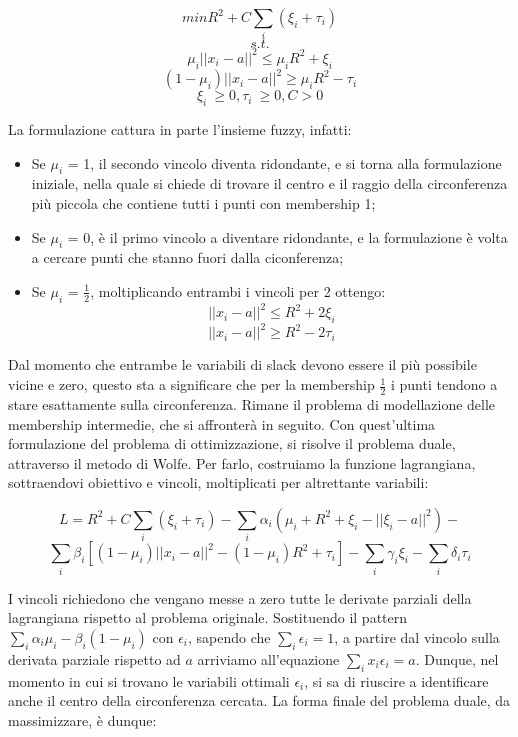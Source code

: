 \documentclass[12pt,a4paper]{report}
\begin{document}
\[ min R^2 + C\sum_{i} (\xi_{i} + \tau_{i})\]
\[s.t.\]
\[ \mu_i||x_i - a||^2  \leq \mu_i R^2 + \xi_{i}\]
\[ (1 - \mu_i)||x_i - a||^2  \geq \mu_i R^2 - \tau_{i}\]
\[ \xi_{i}\ \geq 0, \tau_{i}\ \geq 0 ,  C > 0\]

La formulazione cattura in parte l'insieme fuzzy, infatti:
\begin{itemize}
  \item Se  $\mu_i$ = 1, il secondo vincolo diventa ridondante, e si torna alla formulazione iniziale, nella quale si chiede di trovare il centro  e il raggio della circonferenza più piccola che contiene tutti i punti con membership 1;
  \item Se   $\mu_i$ = 0, è il primo vincolo a diventare ridondante, e la formulazione è volta a cercare punti che stanno fuori dalla ciconferenza;
  \item Se   $\mu_i$ = $\frac{1}{2}$, moltiplicando entrambi i vincoli per 2 ottengo:
\[ ||x_i - a||^2  \leq R^2 + 2\xi_{i}\]
\[ ||x_i - a||^2  \geq R^2 - 2\tau_{i}\]
\end{itemize}

Dal momento che entrambe le variabili di slack devono essere il più possibile vicine e zero, questo sta a significare che per la membership  $\frac{1}{2}$ i punti tendono a stare esattamente sulla circonferenza. Rimane il problema di modellazione delle membership intermedie, che si affronterà in seguito.
Con quest'ultima formulazione del problema di ottimizzazione, si risolve il problema duale, attraverso il metodo di Wolfe. Per farlo, costruiamo la funzione lagrangiana, sottraendovi obiettivo e vincoli, moltiplicati per altrettante variabili:

\[ L = R^2 + C\sum_{i}(\xi_i + \tau_i) - \sum_{i}\alpha_i(\mu_i+R^2 + \xi_i - ||\xi_i - a||^2) -\] 
\[\sum_{i}\beta_i[(1- \mu_i)||x_i - a||^2 - (1 - \mu_i)R^2 + \tau_i] -  \sum_{i}\gamma_i\xi_i - \sum_{i}\delta_i\tau_i\]

I vincoli richiedono che vengano messe a zero tutte le derivate parziali della lagrangiana rispetto al problema originale. Sostituendo il pattern $\sum_{i}\alpha_i\mu_i - \beta_i(1-\mu_i)$ con $\epsilon_i$, sapendo che $\sum_{i}\epsilon_i = 1$, a partire dal vincolo sulla derivata parziale rispetto ad $a$ arriviamo all'equazione  $\sum_{i}x_i\epsilon_i = a$. Dunque, nel momento in cui si trovano le variabili ottimali $\epsilon_i$, si sa di riuscire a identificare anche il centro della circonferenza cercata.
La forma finale del problema duale, da massimizzare, è dunque:
\end{document}
